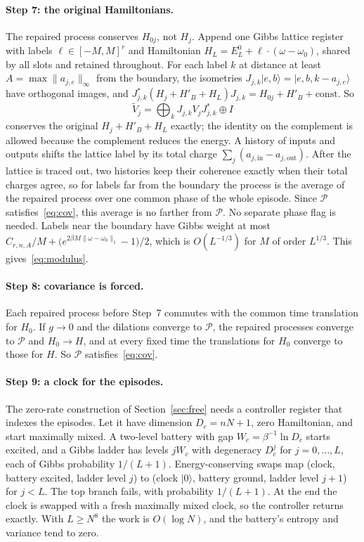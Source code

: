 \documentclass[11pt]{article}
\theoremstyle{definition}
\theoremstyle{remark}
\newcommand{\Pp}{\mathcal P}
\begin{document}
\paragraph{Step 7: the original Hamiltonians.} The repaired process conserves $H_{0j}$, not $H_j$. Append one Gibbs lattice register with labels $\ell\in[-M,M]^r$ and Hamiltonian $H_L=E_L^0+\ell\cdot(\omega-\omega_0)$, shared by all slots and retained throughout. For each label $k$ at distance at least $A=\max\|a_{j,e}\|_\infty$ from the boundary, the isometries $J_{j,k}|e,b\rangle=|e,b,k-a_{j,e}\rangle$ have orthogonal images, and $J_{j,k}^*(H_j+H'_B+H_L)J_{j,k}=H_{0j}+H'_B+\mathrm{const}$. So
\[
\widetilde V_j=\bigoplus_kJ_{j,k}V_jJ_{j,k}^*\oplus I
\]
conserves the original $H_j+H'_B+H_L$ exactly; the identity on the complement is allowed because the complement reduces the energy. A history of inputs and outputs shifts the lattice label by its total charge $\sum_j(a_{j,\mathrm{in}}-a_{j,\mathrm{out}})$. After the lattice is traced out, two histories keep their coherence exactly when their total charges agree, so for labels far from the boundary the process is the average of the repaired process over one common phase of the whole episode. Since $\Pp$ satisfies~\eqref{eq:cov}, this average is no farther from $\Pp$. No separate phase flag is needed. Labels near the boundary have Gibbs weight at most $C_{r,n,A}/M+\bigl(e^{2\beta M\|\omega-\omega_0\|_1}-1\bigr)/2$, which is $O(L^{-1/3})$ for $M$ of order $L^{1/3}$. This gives~\eqref{eq:modulus}.

\paragraph{Step 8: covariance is forced.} Each repaired process before Step~7 commutes with the common time translation for $H_0$. If $g\to0$ and the dilations converge to $\Pp$, the repaired processes converge to $\Pp$ and $H_0\to H$, and at every fixed time the translations for $H_0$ converge to those for $H$. So $\Pp$ satisfies~\eqref{eq:cov}.

\paragraph{Step 9: a clock for the episodes.} The zero-rate construction of Section~\ref{sec:free} needs a controller register that indexes the episodes. Let it have dimension $D_c=nN+1$, zero Hamiltonian, and start maximally mixed. A two-level battery with gap $W_c=\beta^{-1}\ln D_c$ starts excited, and a Gibbs ladder has levels $jW_c$ with degeneracy $D_c^j$ for $j=0,\dots,L$, each of Gibbs probability $1/(L+1)$. Energy-conserving swaps map (clock, battery excited, ladder level $j$) to (clock $|0\rangle$, battery ground, ladder level $j+1$) for $j<L$. The top branch fails, with probability $1/(L+1)$. At the end the clock is swapped with a fresh maximally mixed clock, so the controller returns exactly. With $L\ge N^8$ the work is $O(\log N)$, and the battery's entropy and variance tend to zero.
\end{document}
